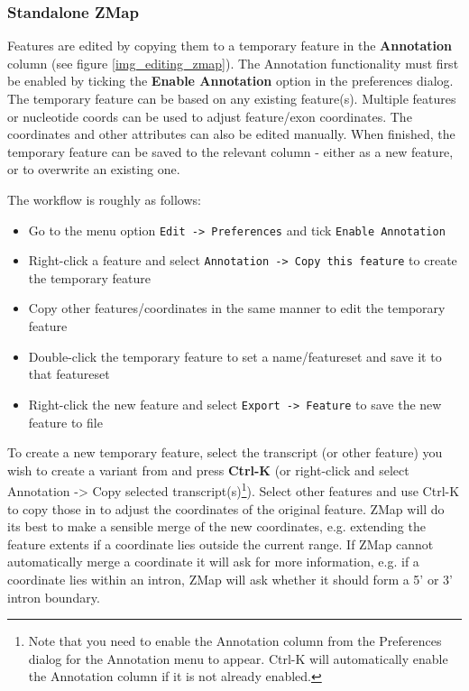 \documentclass[letterpaper]{article}
\begin{document}
\subsubsection{Standalone ZMap}
Features are edited by copying them to a temporary feature in the \textbf{Annotation} column (see figure \ref{img_editing_zmap}). The Annotation functionality must first be enabled by ticking the \textbf{Enable Annotation} option in the preferences dialog. The temporary feature can be based on any existing feature(s). Multiple features or nucleotide coords can be used to adjust feature/exon coordinates. The coordinates and other attributes can also be edited manually. When finished, the temporary feature can be saved to the relevant column - either as a new feature, or to overwrite an existing one. 

The workflow is roughly as follows:
\begin{itemize}
\item Go to the menu option \lstinline{Edit -> Preferences} and tick \lstinline{Enable Annotation}
\item Right-click a feature and select \lstinline{Annotation -> Copy this feature} to create the temporary feature
\item Copy other features/coordinates in the same manner to edit the temporary feature
\item Double-click the temporary feature to set a name/featureset and save it to that featureset
\item Right-click the new feature and select \lstinline{Export -> Feature} to save the new feature to file
\end{itemize}

To create a new temporary feature, select the transcript (or other feature) you wish to create a variant from and press \textbf{Ctrl-K} (or right-click and select Annotation -> Copy selected transcript(s)\footnote{Note that you need to enable the Annotation column from the Preferences dialog for the Annotation menu to appear. Ctrl-K will automatically enable the Annotation column if it is not already enabled.}). Select other features and use Ctrl-K to copy those in to adjust the coordinates of the original feature. ZMap will do its best to make a sensible merge of the new coordinates, e.g. extending the feature extents if a coordinate lies outside the current range. If ZMap cannot automatically merge a coordinate it will ask for more information, e.g. if a coordinate lies within an intron, ZMap will ask whether it should form a 5' or 3' intron boundary.
\end{document}
